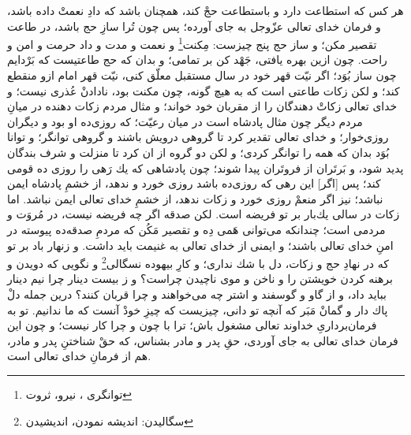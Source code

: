 هر كس كه استطاعت دارد و باستطاعت حجْ كند، همچنان باشد كه دادِ نعمتْ داده باشد، و فرمان خداى تعالى عزّوجل به جاى آورده؛ پس چون تُرا سازِ حج باشد، در طاعت تقصير مكن؛ و ساز حج پنج چيزست: مِكنت\footnote{توانگری ، نیرو، ثروت}
 و نعمت و مدت و داد حرمت و امن و راحت. چون ازين بهره يافتى، جَهْد كن بر تمامى؛ و بدان كه حج طاعتيست كه بَرْدايم چون ساز بُوَد؛ اگر نيّت قهر خود در سال مستقبل معلّق كنى، نيّت قهر امام ازو منقطع كند؛ و لكن زكات طاعتى است كه به هيچ گونه، چون مكنت بود، نادادنْ عُذرى نيست؛ و خداى تعالى زكاتْ دهندگان را از مقربان خود خواند؛ و مثال مردم زكات دهنده در ميانِ مردم ديگر چون مثال پادشاه است در ميان رعيّت؛ كه روزى‌ده او بود و ديگران روزى‌خوار؛ و خداى تعالى تقدير كرد تا گروهى درويش باشند و گروهى توانگر؛ و توانا بُوَد بدان كه همه را توانگر كردى؛ و لكن دو گروه از ان كرد تا منزلت  و شرف بندگان پديد شود، و بَرتَران از فروتَران پيدا شوند؛ چون پادشاهى كه يك رَهى را روزى ده قومى كند؛ پس [اگر] اين رهى كه روزى‌ده باشد روزى خورد و ندهد، از خشمِ پادشاه ايمن نباشد؛ نيز اگر منعمْ روزى خورد و زكات ندهد، از خشمِ خداى تعالى ايمن نباشد. اما زكات در سالى يك‌بار بر تو فريضه است. لكن صدقه اگر چه فريضه نيست، در مُروَت و مردمى است؛ چندانكه مى‌توانى هَمى دِه و تقصير مَكُن كه مردمِ صدقه‌ده پيوسته در امنِ خداى تعالى باشند؛ و ايمنى از خداى تعالى به غنيمت بايد داشت. و زنهار باد بر تو كه در نهادِ حج و زكات، دل با شك ندارى؛ و كارِ بيهوده نسگالى\footnote{سگالیدن: اندیشه نمودن، اندیشیدن} و نگويى كه دويدن و برهنه كردن خويشتن را و ناخن و موى ناچيدن چراست‌؟ و ز بيست دينار چرا نيم دينار ببايد داد، و از گاو و گوسفند و اشتر چه مى‌خواهند و چرا قربان كنند؟ درين جمله دلْ پاك‌ دار و گمانْ مَبَر كه آنچه تو دانى، چيزيست كه چيزِ خودْ آنست كه ما ندانيم. تو به فرمان‌بردارىِ خداوند تعالى مشغول باش؛ ترا با چون و چرا كار نيست؛ و چون اين فرمان خداى تعالى به جاى آوردى، حقِ پدر و مادر بشناس، كه حقْ شناختنِ پدر و مادر، هم از فرمانِ خداى تعالى است.


\newpage










